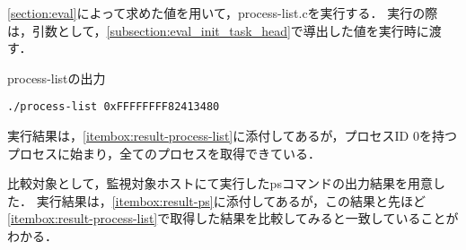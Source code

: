 \ref{section:eval}によって求めた値を用いて，process-list.cを実行する．
実行の際は，引数として，\ref{subsection:eval_init_task_head}で導出した値を実行時に渡す．

\begin{itembox}[l]{process-listの出力}
    \begin{verbatim}
./process-list 0xFFFFFFFF82413480
    \end{verbatim}
\end{itembox}

実行結果は，\ref{itembox:result-process-list}に添付してあるが，プロセスID 0を持つプロセスに始まり，全てのプロセスを取得できている．

比較対象として，監視対象ホストにて実行したpsコマンドの出力結果を用意した．
実行結果は，\ref{itembox:result-ps}に添付してあるが，この結果と先ほど\ref{itembox:result-process-list}で取得した結果を比較してみると一致していることがわかる．

